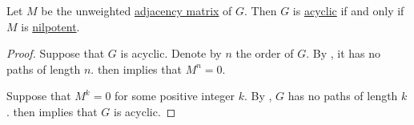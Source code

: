 \begin{proposition}\label{thm:nilpotent_adjacency_matrix}
  Let \( M \) be the unweighted \hyperref[def:graph_adjacency_matrix]{adjacency matrix} of \( G \). Then \( G \) is \hyperref[def:acyclic_graph]{acyclic} if and only if \( M \) is \hyperref[def:nilpotent]{nilpotent}.
\end{proposition}
\begin{proof}
  \SufficiencySubProof* Suppose that \( G \) is acyclic. Denote by \( n \) the order of \( G \). By , it has no paths of length \( n \).  then implies that \( M^n = 0 \).

  \NecessitySubProof* Suppose that \( M^k = 0 \) for some positive integer \( k \). By , \( G \) has no paths of length \( k \).  then implies that \( G \) is acyclic.
\end{proof}

